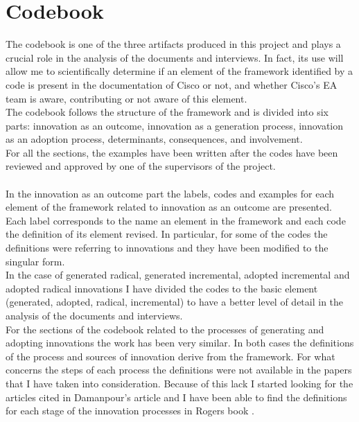\section{Codebook}
The codebook is one of the three artifacts produced in this project and plays a crucial role in the analysis of the documents and interviews.
In fact, its use will allow me to scientifically determine if an element of the framework identified by a code is present in the documentation of Cisco or not, and whether Cisco's EA team is aware, contributing or not aware of this element. \\
The codebook follows the structure of the framework and is divided into six parts: innovation as an outcome, innovation as a generation process, innovation as an adoption process, determinants, consequences, and involvement. \\
For all the sections, the examples have been written after the codes have been reviewed and approved by one of the supervisors of the project.
\\ \\ %
In the innovation as an outcome part the labels, codes and examples for each element of the framework related to innovation as an outcome are presented. Each label corresponds to the name an element in the framework and each code the definition of its element revised. In particular, for some of the codes the definitions were referring to innovations and they have been modified to the singular form. \\
In the case of generated radical, generated incremental, adopted incremental and adopted radical innovations I have divided the codes to the basic element (generated, adopted, radical, incremental) to have a better level of detail in the analysis of the documents and interviews.
\\ %
For the sections of the codebook related to the processes of generating and adopting innovations the work has been very similar. In both cases the definitions of the process and sources of innovation derive from the framework.
For what concerns the steps of each process the definitions were not available in the papers that I have taken into consideration. Because of this lack I started looking for the articles cited in Damanpour's article \citep{damanpour2006} and I have been able to find the definitions for each stage of the innovation processes in Rogers book \citep{rogers2003}. \\
